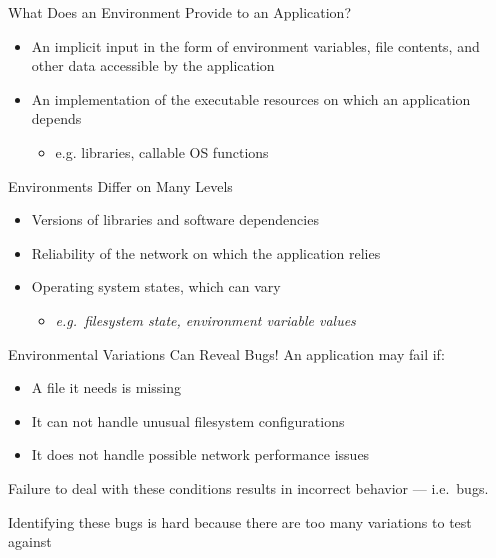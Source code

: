 \documentclass[pdf]{beamer}
\begin{document}


\begin{frame}{What Does an Environment Provide to an Application?}
  \begin{itemize}
    \item{An implicit input in the form of environment variables, file
      contents, and other data accessible by the application}
    \item{An implementation of the executable resources on which an application depends}
      \begin{itemize}
        \item{e.g. libraries, callable OS functions}
      \end{itemize}
  \end{itemize}
\end{frame}


\begin{frame}{Environments Differ on Many Levels}
  \begin{itemize}
    \item{Versions of libraries and software dependencies}
    \item{Reliability of the network on which the application relies}
    \item{Operating system states, which can vary}
      \begin{itemize}
        \item{\textit{e.g.\ filesystem state, environment variable values}}
      \end{itemize}
  \end{itemize}
\end{frame}


\begin{frame}{Environmental Variations Can Reveal Bugs!}
  An application may fail if:
  \begin{itemize}
    \item{A file it needs is missing}
    \item{It can not handle unusual filesystem configurations}
    \item{It does not handle possible network performance issues}

  \end{itemize}
  Failure to deal with these conditions results in incorrect behavior --- i.e.\ bugs.

  Identifying these bugs is hard because there are too many variations to
  test against
\end{frame}
\end{document}
